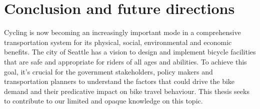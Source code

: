 \documentclass [11pt, proquest] {uwthesis}[2015/03/03]
\begin{document}
\newpage
\thispagestyle{empty}
\mbox{}


%
%



\chapter{Conclusion and future directions}

Cycling is now becoming an increasingly important mode in a comprehensive transportation system for its physical, social, environmental and economic benefits. The city of Seattle has a vision to design and implement bicycle facilities that are safe and appropriate for riders of all ages and abilities. To achieve this goal, it's crucial for the government stakeholders, policy makers and transportation planners to understand the factors that could drive the bike demand and their predicative impact on bike travel behaviour. This thesis seeks to contribute to our limited and opaque knowledge on this topic.
\end{document}
